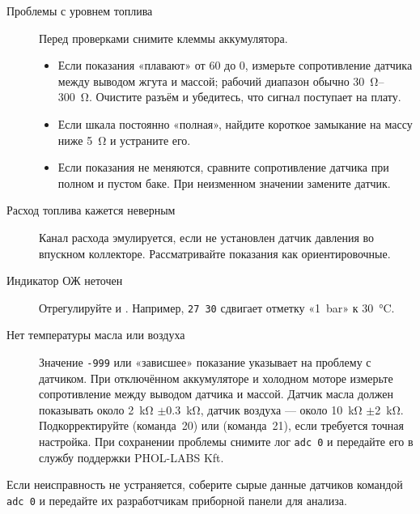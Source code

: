 \begin{description}
    \item[Проблемы с уровнем топлива] Перед проверками снимите клеммы аккумулятора.
    \begin{itemize}
        \item Если показания «плавают» от 60 до 0, измерьте сопротивление датчика между выводом жгута и массой; рабочий диапазон обычно \SIrange{30}{300}{\ohm}. Очистите разъём и убедитесь, что сигнал поступает на плату.
        \item Если шкала постоянно «полная», найдите короткое замыкание на массу ниже \SI{5}{\ohm} и устраните его.
        \item Если показания не меняются, сравните сопротивление датчика при полном и пустом баке. При неизменном значении замените датчик.
    \end{itemize}
    \item[Расход топлива кажется неверным] Канал расхода эмулируется, если не установлен датчик давления во впускном коллекторе. Рассматривайте показания как ориентировочные.
    \item[Индикатор ОЖ неточен] Отрегулируйте  и . Например, \verb|27 30| сдвигает отметку «1~bar» к \SI{30}{\celsius}.
    \item[Нет температуры масла или воздуха] Значение \texttt{-999} или «зависшее» показание указывает на проблему с датчиком. При отключённом аккумуляторе и холодном моторе измерьте сопротивление между выводом датчика и массой. Датчик масла должен показывать около \SI{2}{\kilo\ohm} \ensuremath{\pm}\SI{0.3}{\kilo\ohm}, датчик воздуха — около \SI{10}{\kilo\ohm} \ensuremath{\pm}\SI{2}{\kilo\ohm}. Подкорректируйте  (команда~20) или  (команда~21), если требуется точная настройка. При сохранении проблемы снимите лог \verb|adc 0| и передайте его в службу поддержки PHOL-LABS Kft.
\end{description}

Если неисправность не устраняется, соберите сырые данные датчиков командой \verb|adc 0| и передайте их разработчикам приборной панели для анализа.
